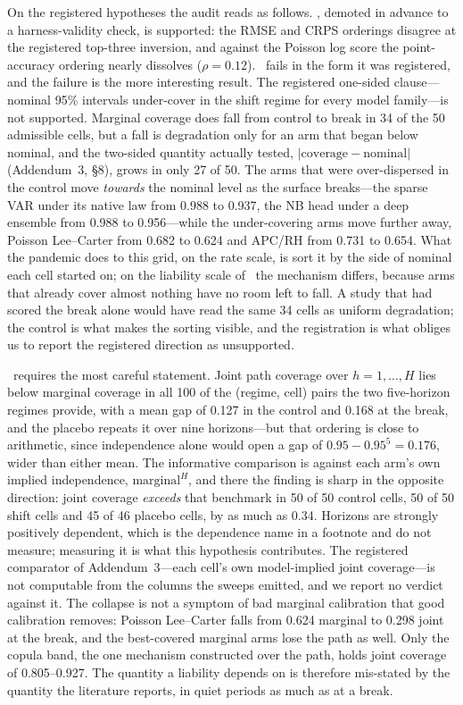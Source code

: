 On the registered hypotheses the audit reads as follows. \Hone, demoted in
advance to a harness-validity check, is supported: the RMSE and CRPS
orderings disagree at the registered top-three inversion, and against the
Poisson log score the point-accuracy ordering nearly dissolves
($\rho=0.12$). \Htwo\ fails in the form it was registered, and the failure
is the more interesting result. The registered one-sided clause---nominal
95\% intervals under-cover in the shift regime for every model
family---is not supported. Marginal coverage does fall from control to
break in 34 of the 50 admissible cells, but a fall is degradation only
for an arm that began below nominal, and the two-sided quantity actually
tested, $|\text{coverage}-\text{nominal}|$ (Addendum~3, \S8), grows in
only 27 of 50. The arms that were over-dispersed in the control move
\emph{towards} the nominal level as the surface breaks---the sparse VAR
under its native law from 0.988 to 0.937, the NB head under a deep
ensemble from 0.988 to 0.956---while the under-covering arms move further
away, Poisson Lee--Carter from 0.682 to 0.624 and APC/RH from 0.731 to
0.654. What the pandemic does to this grid, on the rate scale, is sort it
by the side of nominal each cell started on; on the liability scale of
\Hfive\ the mechanism differs, because arms that already cover almost
nothing have no room left to fall. A study that had scored the break alone
would have read the same 34 cells as uniform degradation; the control is
what makes the sorting visible, and the registration is what obliges us
to report the registered direction as unsupported.

\Hthree\ requires the most careful statement. Joint path coverage over
$h=1,\dots,H$ lies below marginal coverage in all 100 of the (regime,
cell) pairs the two five-horizon regimes provide, with a mean gap of
0.127 in the control and 0.168 at the break, and the placebo repeats it
over nine horizons---but that ordering is close to arithmetic, since
independence alone would open a gap of $0.95-0.95^5=0.176$, wider than
either mean. The informative comparison is against each arm's own
implied independence, $\text{marginal}^H$, and there the finding is
sharp in the opposite direction: joint coverage \emph{exceeds} that
benchmark in 50 of 50 control cells, 50 of 50 shift cells and 45 of 46
placebo cells, by as much as 0.34. Horizons are strongly positively
dependent, which is the dependence \citet{dowd2010backtesting} name in a
footnote and do not measure; measuring it is what this hypothesis
contributes. The registered comparator of Addendum~3---each cell's own
model-implied joint coverage---is not computable from the columns the
sweeps emitted, and we report no verdict against it. The collapse is not a symptom of
bad marginal calibration that good calibration removes: Poisson
Lee--Carter falls from 0.624 marginal to 0.298 joint at the break, and
the best-covered marginal arms lose the path as well. Only the copula
band, the one mechanism constructed over the path, holds joint coverage
of 0.805--0.927. The quantity a liability depends on is therefore
mis-stated by the quantity the literature reports, in quiet periods as
much as at a break.

